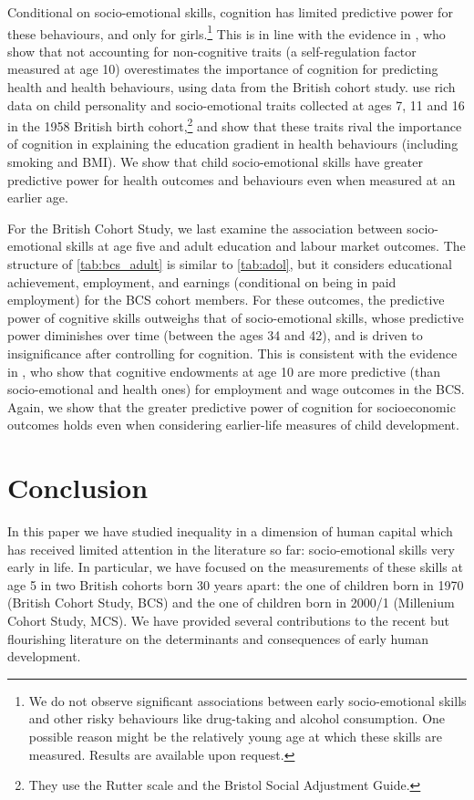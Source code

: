 Conditional on socio-emotional skills, cognition has limited predictive power for these behaviours, and only for girls.\footnote{We do not observe significant associations between early socio-emotional skills and other risky behaviours like drug-taking and alcohol consumption. One possible reason might be the relatively young age at which these skills are measured. Results are available upon request.} This is in line with the evidence in \citet{conti2010understanding}, who show that not accounting for non-cognitive traits (a self-regulation factor measured at age 10) overestimates the importance of cognition for predicting health and health behaviours, using data from the British cohort study. \citet{conti2013personality} use rich data on child personality and socio-emotional traits collected at ages 7, 11 and 16 in the 1958 British birth cohort,\footnote{They use the Rutter scale and the Bristol Social Adjustment Guide.} and show that these traits rival the importance of cognition in explaining the education gradient in health behaviours (including smoking and BMI). We show that child socio-emotional skills have greater predictive power for health outcomes and behaviours even when measured at an earlier age.

For the British Cohort Study, we last examine the association between socio-emotional skills at age five and adult education and labour market outcomes. The structure of \autoref{tab:bcs_adult} is similar to \autoref{tab:adol}, but it considers educational achievement, employment, and earnings (conditional on being in paid employment) for the BCS cohort members. For these outcomes, the predictive power of cognitive skills outweighs that of socio-emotional skills, whose predictive power diminishes over time (between the ages 34 and 42), and is driven to insignificance after controlling for cognition. This is consistent with the evidence in \citet{conti2011early}, who show that cognitive endowments at age 10 are more predictive (than socio-emotional and health ones) for employment and wage outcomes in the BCS. Again, we show that the greater predictive power of cognition for socioeconomic outcomes holds even when considering earlier-life measures of child development.

\section{Conclusion}\label{sec:conclusions}

In this paper we have studied inequality in a dimension of human capital which has received limited attention in the literature so far: socio-emotional skills very early in life. In particular, we have focused on the measurements of these skills at age 5 in two British cohorts born 30 years apart: the one of children born in 1970 (British Cohort Study, BCS) and the one of children born in 2000/1 (Millenium Cohort Study, MCS). We have provided several contributions to the recent but flourishing literature on the determinants and consequences of early human development.


